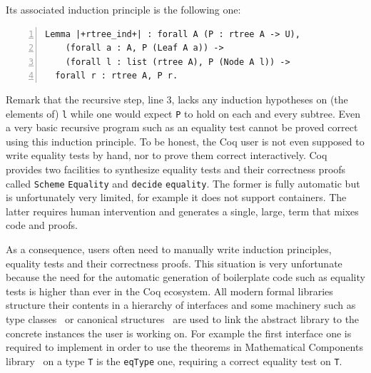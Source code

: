 \documentclass[a4paper,UKenglish,cleveref, autoref]{lipics-v2019}
\begin{document}
\noindent
Its associated induction principle is the following one:

\begin{lstlisting}[numbers=left]
Lemma |+rtree_ind+| : forall A (P : rtree A -> U),
    (forall a : A, P (Leaf A a)) ->
    (forall l : list (rtree A), P (Node A l)) ->
  forall r : rtree A, P r.
\end{lstlisting}

Remark that the recursive step, line 3, lacks any induction hypotheses
on (the elements of) \lstinline+l+ while one would expect
\lstinline+P+ to hold on each and every subtree. Even a very basic
recursive program such as an equality test cannot be proved correct
using this induction principle.
To be honest, the Coq
user is not even supposed to write equality tests by hand, nor to prove
them correct interactively.  Coq provides two facilities to synthesize
equality tests and their correctness proofs called 
\lstinline+Scheme+ \lstinline+Equality+ and
\lstinline+decide+ \lstinline+equality+. 
The former is fully
automatic but is unfortunately very limited, for example it does not support
containers.  The latter requires human intervention 
and generates a single, large, term that mixes code and proofs.

As a consequence, %
users often need to manually write induction principles,
equality tests and their correctness proofs.
This situation is very unfortunate because the need for the automatic
generation of boilerplate code such as equality tests
is higher than ever in the Coq ecosystem.
All modern formal libraries structure their contents in a
hierarchy of interfaces and some machinery such as type
classes~\cite{Sozeau:2008:FTC:1459784.1459810} or
canonical structures~\cite{10.1007/978-3-642-39634-2_5}
are used to link the abstract library to the
concrete instances the user is working on.
For example the first interface one
is required to implement in order to use the theorems in Mathematical
Components library~\cite{mcb} on a type \lstinline+T+ is the \lstinline+eqType+
one, requiring a correct equality test on \lstinline+T+.

\end{document}
